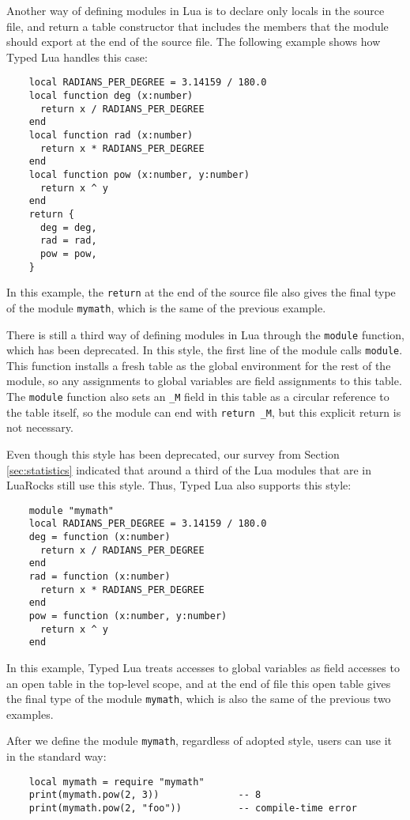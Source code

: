 Another way of defining modules in Lua is to declare only locals
in the source file, and return a table constructor that includes
the members that the module should export at the end of the source file.
The following example shows how Typed Lua handles this case:
\begin{verbatim}
    local RADIANS_PER_DEGREE = 3.14159 / 180.0
    local function deg (x:number)
      return x / RADIANS_PER_DEGREE
    end
    local function rad (x:number)
      return x * RADIANS_PER_DEGREE
    end
    local function pow (x:number, y:number)
      return x ^ y
    end
    return {
      deg = deg,
      rad = rad,
      pow = pow,
    }
\end{verbatim}

In this example, the \texttt{return} at the end of the source file
also gives the final type of the module \texttt{mymath}, which is
the same of the previous example.

There is still a third way of defining modules in Lua through the
\texttt{module} function, which has been deprecated.
In this style, the first line of the module calls \texttt{module}.
This function installs a fresh table as the global environment for
the rest of the module, so any assignments to global variables are
field assignments to this table.
The \texttt{module} function also sets an \texttt{\string_M} field
in this table as a circular reference to the table itself,
so the module can end with \texttt{return \string_M},
but this explicit return is not necessary.

Even though this style has been deprecated, our survey from
Section \ref{sec:statistics} indicated that around a third of the
Lua modules that are in LuaRocks still use this style.
Thus, Typed Lua also supports this style:
\begin{verbatim}
    module "mymath"
    local RADIANS_PER_DEGREE = 3.14159 / 180.0
    deg = function (x:number)
      return x / RADIANS_PER_DEGREE
    end
    rad = function (x:number)
      return x * RADIANS_PER_DEGREE
    end
    pow = function (x:number, y:number)
      return x ^ y
    end
\end{verbatim}

In this example, Typed Lua treats accesses to global variables as
field accesses to an open table in the top-level scope,
and at the end of file this open table gives the final type of the
module \texttt{mymath}, which is also the same of the previous two
examples.

After we define the module \texttt{mymath}, regardless of adopted style,
users can use it in the standard way:
\begin{verbatim}
    local mymath = require "mymath"
    print(mymath.pow(2, 3))              -- 8
    print(mymath.pow(2, "foo"))          -- compile-time error
\end{verbatim}

